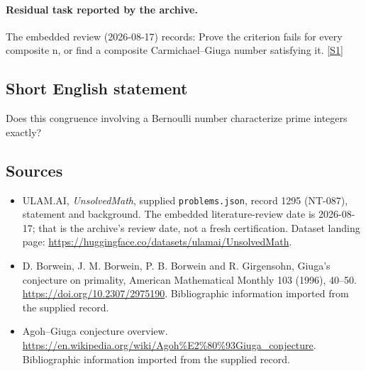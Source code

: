 \documentclass[11pt,a4paper]{article}
\newcommand{\sref}[2]{\hyperlink{source:#1:#2}{[S#2]}}
\begin{document}
\paragraph{Residual task reported by the archive.}

The embedded review (2026-08-17) records: Prove the criterion fails for every composite n, or find a composite Carmichael--Giuga number satisfying it. \sref{1295}{1}

\subsection{Short English statement}

Does this congruence involving a Bernoulli number characterize prime integers exactly?

\subsection{Sources}

{\small

\begin{itemize}

\item[\hypertarget{source:1295:1}{S1}] ULAM.AI, \emph{UnsolvedMath}, supplied \texttt{problems.json}, record 1295 (NT-087), statement and background. The embedded literature-review date is 2026-08-17; that is the archive’s review date, not a fresh certification. Dataset landing page: \url{https://huggingface.co/datasets/ulamai/UnsolvedMath}.

\item[\hypertarget{source:1295:2}{S2}] D. Borwein, J. M. Borwein, P. B. Borwein and R. Girgensohn, Giuga's conjecture on primality, American Mathematical Monthly 103 (1996), 40--50. \url{https://doi.org/10.2307/2975190}. Bibliographic information imported from the supplied record.

\item[\hypertarget{source:1295:3}{S3}] Agoh--Giuga conjecture overview. \url{https://en.wikipedia.org/wiki/Agoh%E2%80%93Giuga_conjecture}. Bibliographic information imported from the supplied record.

\end{itemize}

}

\label{end:1295}
\end{document}
